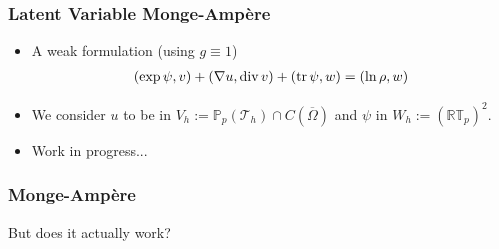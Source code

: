 \documentclass[aspectratio=169,xcolor=dvipsnames,11pt]{beamer}
\begin{document}
\begin{frame}\frametitle{Latent Variable Monge-Amp\`ere}
\begin{itemize}
\item A weak formulation (using $g \equiv 1$)
\[
\aligned
(\exp \psi, v) + (\nabla u, \operatorname{div} v) + (\operatorname{tr} \psi, w) = (\ln \rho, w) 
\endaligned
\]
\item We consider $u$ to be in $V_h := \mathbb P_{p}(\mathcal{T}_h) \cap C(\overline{\Omega})$ and $\psi$ in $W_h := (\mathbb R \mathbb T_{p})^2$.
\item {\color{Red} Work in progress...}
\end{itemize}
\end{frame}

\begin{frame}\frametitle{Monge-Amp\`ere}
{\Large
{\color{Maroon}
But does it actually work?
}
}
\end{frame}
\end{document}
